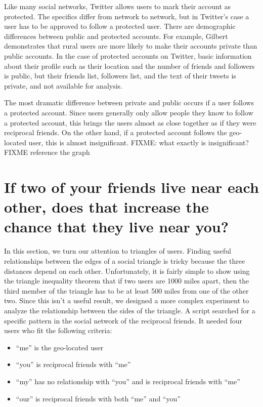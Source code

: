 Like many social networks, Twitter allows users to mark their account as
protected. The specifics differ from network to network, but in Twitter's case
a user has to be approved to follow a protected user.
There are demographic differences between public and protected accounts.
For example, Gilbert \cite{gilbert2008network} demonstrates that rural users
are more likely to make their accounts private than public accounts.
In the case of protected accounts on Twitter, basic information
about their profile such as their location and the number of friends and
followers is public, but their friends list, followers list, and the text of
their tweets is private, and not available for analysis.

The most dramatic difference between private and public occurs if a user
follows a protected account.
Since users generally only allow people they know to follow a protected
account, this brings the users almost as close together as if they were
reciprocal friends.
On the other hand, if a protected account follows the geo-located user, this is
almost insignificant.
FIXME: what exactly is insignificant?
FIXME reference the graph

\section{If two of your friends live near each other, does that increase the
chance that they live near you?}
In this section, we turn our attention to triangles of users.
Finding useful relationships between the edges of a social triangle is tricky
because the three distances depend on each other.
Unfortunately, it is fairly simple to show using the triangle inequality theorem
that if two users are 1000 miles apart, then the third member of the triangle
has to be at least 500 miles from one of the other two.
Since this isn't a useful result, we designed a more complex experiment to
analyze the relationship between the sides of the triangle.
A script searched for a specific pattern in the social network of the
reciprocal friends.  It needed four users who fit the following criteria:
\begin{itemize}
\item ``me'' is the geo-located user
\item ``you'' is reciprocal friends with ``me''
\item ``my'' has no relationship with ``you'' and is reciprocal friends with ``me''
\item ``our'' is reciprocal friends with both ``me'' and ``you''
\end{itemize}

